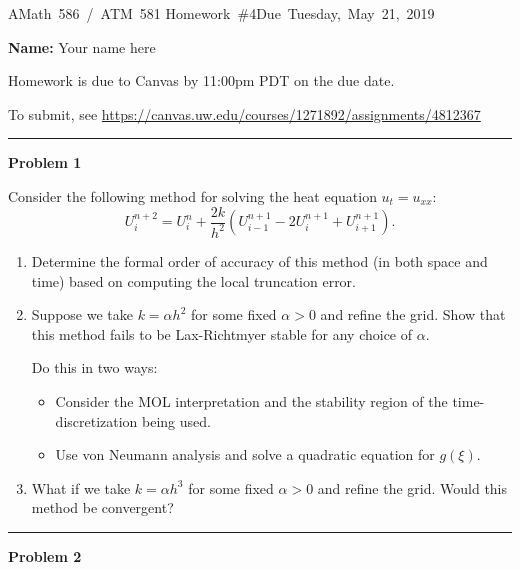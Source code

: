 \documentclass[10pt]{article}
\begin{document}
\hfill\vbox{\hbox{AMath 586 / ATM 581}
\hbox{Homework \#4}\hbox{Due Tuesday, May 21, 2019}}

{\bf Name:} Your name here
\vskip 5pt

Homework is due to Canvas by 11:00pm PDT on the due date.

To submit, see \url{https://canvas.uw.edu/courses/1271892/assignments/4812367}


\vskip 1cm
\hrule
{\bf Problem 1}  


Consider the following method for solving the heat equation
$u_t=u_{xx}$:
\[
U_i^{n+2} = U_i^n + \frac{2k}{h^2}(U_{i-1}^{n+1} - 2U_i^{n+1} +
U_{i+1}^{n+1}).
\]
\begin{enumerate}
\item Determine the formal order of accuracy of this method 
(in both space and time) based on computing the local truncation error.

\item Suppose we take $k=\alpha h^2$ for some fixed $\alpha>0$ and refine
the grid.  Show that this method fails to be 
Lax-Richtmyer stable for any choice of $\alpha$.

Do this in two ways: 
\begin{itemize}
\item Consider the MOL interpretation and the stability region of
the time-discretization being used.
\item Use von Neumann analysis and solve a quadratic equation for $g(\xi)$.
\end{itemize} 

\item What if we take $k=\alpha h^3$ for some fixed $\alpha>0$ and refine
the grid. Would this method be convergent?

\end{enumerate}




\vskip 1cm
\hrule
{\bf Problem 2}  
\end{document}
